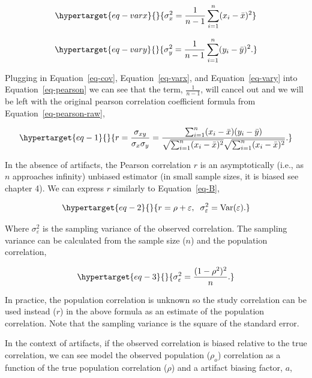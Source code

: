 \documentclass[
  letterpaper,
  DIV=11,
  numbers=noendperiod]{scrreprt}
\begin{document}
\begin{equation}\protect\hypertarget{eq-varx}{}{
\sigma^2_x = \frac{1}{n-1}\sum_{i=1}^n (x_i - \bar{x})^2
}\label{eq-varx}\end{equation}

\begin{equation}\protect\hypertarget{eq-vary}{}{
\sigma^2_y = \frac{1}{n-1}\sum_{i=1}^n (y_i - \bar{y})^2.
}\label{eq-vary}\end{equation}

Plugging in Equation~\ref{eq-cov}, Equation~\ref{eq-varx}, and
Equation~\ref{eq-vary} into Equation~\ref{eq-pearson} we can see that
the term, \(\frac{1}{n-1}\), will cancel out and we will be left with
the original pearson correlation coefficient formula from
Equation~\ref{eq-pearson-raw},

\begin{equation}\protect\hypertarget{eq-1}{}{
r = \frac{\sigma_{xy}}{\sigma_x\sigma_y} = \frac{\sum_{i=1}^{n}(x_i - \bar{x})(y_i - \bar{y})}{\sqrt{\sum_{i=1}^{n}(x_i - \bar{x})^2}\sqrt{\sum_{i=1}^{n}(x_i - \bar{x})^2}}.
}\label{eq-1}\end{equation}

In the absence of artifacts, the Pearson correlation \(r\) is an
asymptotically (i.e., as \(n\) approaches infinity) unbiased estimator
(in small sample sizes, it is biased see chapter 4). We can express
\(r\) similarly to Equation~\ref{eq-B},

\begin{equation}\protect\hypertarget{eq-2}{}{
r = \rho + \varepsilon,\;\; \sigma_\varepsilon^2 = \text{Var}(\varepsilon).
}\label{eq-2}\end{equation}

Where \(\sigma^2_\varepsilon\) is the sampling variance of the observed
correlation. The sampling variance can be calculated from the sample
size (\(n\)) and the population correlation,

\begin{equation}\protect\hypertarget{eq-3}{}{
\sigma_\varepsilon^2 =\frac{(1 - \rho^2)^2}{n}.
}\label{eq-3}\end{equation}

In practice, the population correlation is unknown so the study
correlation can be used instead (\(r\)) in the above formula as an
estimate of the population correlation. Note that the sampling variance
is the square of the standard error.

In the context of artifacts, if the observed correlation is biased
relative to the true correlation, we can see model the observed
population (\(\rho_o\)) correlation as a function of the true population
correlation (\(\rho\)) and a artifact biasing factor, \(a\),
\end{document}
